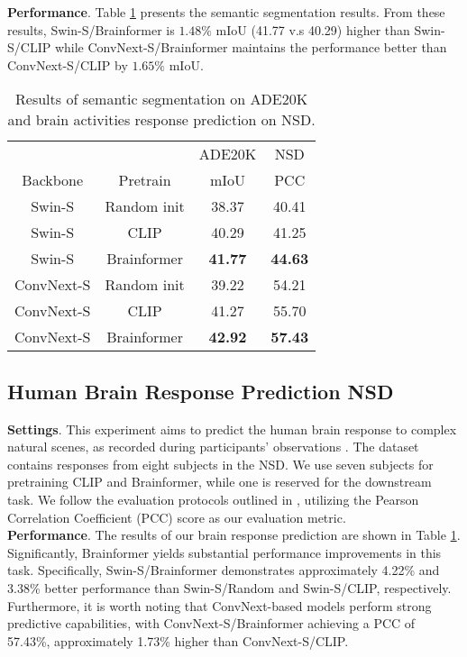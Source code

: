 \noindent
\textbf{Performance}. Table \ref{tab:semantic_segmentation} presents the semantic segmentation results. From these results, Swin-S/Brainformer is $1.48\%$ mIoU (41.77 v.s 40.29) higher than  Swin-S/CLIP while ConvNext-S/Brainformer maintains the performance better than ConvNext-S/CLIP by $1.65\%$ mIoU.


\begin{table}[!t]
    \centering
    \caption{Results of semantic segmentation on ADE20K and brain activities response prediction on NSD.}
    \label{tab:semantic_segmentation}
    \vspace{-4mm}
    \begin{tabular}{c|c|c|c}
        \Xhline{1.0pt}
        & & \multicolumn{1}{c|}{ADE20K} & \multicolumn{1}{c}{NSD}\\
        \multicolumn{1}{c|}{Backbone} & \multicolumn{1}{c|}{Pretrain} & mIoU & PCC\\
        \hline
        Swin-S & Random init & 38.37 & 40.41 \\
        Swin-S & CLIP \cite{clip} & 40.29 & 41.25 \\
        Swin-S & Brainformer & \textbf{41.77} & \textbf{44.63} \\
        \hline
        ConvNext-S & Random init & 39.22 & 54.21 \\
        ConvNext-S & CLIP \cite{clip} & 41.27 & 55.70 \\
        ConvNext-S & Brainformer & \textbf{42.92} & \textbf{57.43}\\
        \hline
    \end{tabular}
    \vspace{-6mm}
\end{table}



\subsection{Human Brain Response Prediction NSD}
\textbf{Settings}. This experiment aims to predict the human brain response to complex natural scenes, as recorded during participants' observations \cite{algonauts, nsd}. The dataset contains responses from eight subjects in the NSD. We use seven subjects for pretraining CLIP and Brainformer, while one is reserved for the downstream task. We follow the evaluation protocols outlined in \cite{algonauts}, utilizing the Pearson Correlation Coefficient (PCC) score as our evaluation metric.\\
\noindent
\textbf{Performance}. The results of our brain response prediction are shown in Table \ref{tab:semantic_segmentation}. Significantly, Brainformer yields substantial performance improvements in this task. Specifically, Swin-S/Brainformer demonstrates approximately 4.22\% and 3.38\% better performance than Swin-S/Random and Swin-S/CLIP, respectively. Furthermore, it is worth noting that ConvNext-based models perform strong predictive capabilities, with ConvNext-S/Brainformer achieving a PCC of 57.43\%, approximately 1.73\% higher than ConvNext-S/CLIP.



